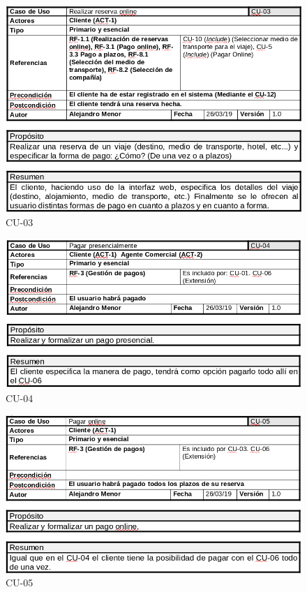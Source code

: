 \documentclass{article}
\begin{document}
	\begin{figure}[H]
		\centering
		\includegraphics[totalheight=9cm]{cu-03}
		\caption{CU-03}
		\label{fig:cu-03}
	\end{figure}

	\begin{figure}[H]
		\centering
		\includegraphics[totalheight=7cm]{cu-04}
		\caption{CU-04}
		\label{fig:cu-04}
	\end{figure}

	\begin{figure}[H]
		\centering
		\includegraphics[totalheight=7.5cm]{cu-05}
		\caption{CU-05}
		\label{fig:cu-05}
	\end{figure}
\end{document}
